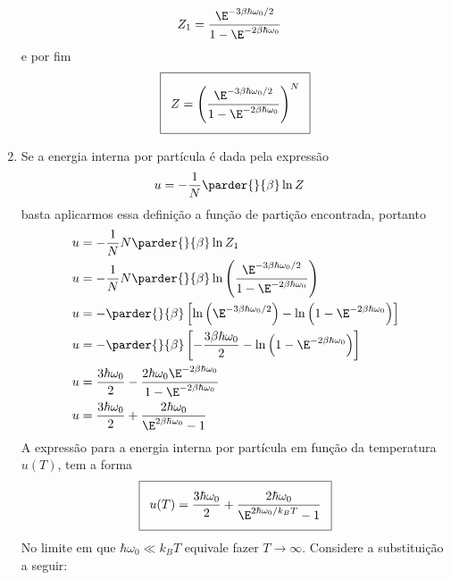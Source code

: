 \begin{prob}
\begin{sol}
\begin{enumerate}[label=\alph *)]
\begin{align}
\begin{split}
          Z_1&=\frac{\E^{-3\beta\hbar\omega_0/2}}{1-\E^{-2\beta\hbar\omega_0}}
        \end{split}
      \end{align}
      e por fim
      \begin{align}
        \addtolength{\fboxsep}{5pt}
        \boxed{
          \begin{gathered}
            Z=\left(\frac{\E^{-3\beta\hbar\omega_0/2}}{1-\E^{-2\beta\hbar\omega_0}}\right)^N
          \end{gathered}
        }        
      \end{align}
      \item Se a energia interna por partícula é dada pela expressão
      \begin{align}
        u&=-\frac{1}{N}\parder{}{\beta}\ln Z
      \end{align}
      basta aplicarmos essa definição a função de partição encontrada, portanto
      \begin{align}
        \begin{split}
          u&=-\frac{1}{N}N\parder{}{\beta}\ln Z_1\\
          u&=-\frac{1}{N}N\parder{}{\beta}\ln \left(\frac{\E^{-3\beta\hbar\omega_0/2}}{1-\E^{-2\beta\hbar\omega_0}}\right)\\
          u&=-\parder{}{\beta}\left[\ln\left(\E^{-3\beta\hbar\omega_0/2}\right)-\ln\left(1-\E^{-2\beta\hbar\omega_0}\right)\right]\\
          u&=-\parder{}{\beta}\left[-\frac{3\beta\hbar\omega_0}{2}-\ln\left(1-\E^{-2\beta\hbar\omega_0}\right)\right]\\
          u&=\frac{3\hbar\omega_0}{2}-\frac{2\hbar\omega_0 \E^{-2\beta\hbar\omega_0}}{1-\E^{-2\beta\hbar\omega_0}}\\
          u&=\frac{3\hbar\omega_0}{2}+\frac{2\hbar\omega_0}{\E^{2\beta\hbar\omega_0}-1}
        \end{split}
      \end{align}
      A expressão para a energia interna por partícula em função da temperatura $u(T)$, tem a forma
      \begin{align}
        \addtolength{\fboxsep}{5pt}
        \boxed{
          \begin{gathered}
            u(T)=\frac{3\hbar\omega_0}{2}+\frac{2\hbar\omega_0}{\E^{2\hbar\omega_0/k_BT}-1}
          \end{gathered}
        }
      \end{align}
      No limite em que $\hbar\omega_0\ll k_BT$ equivale fazer $T\to\infty$. Considere a substituição a seguir:

\end{enumerate}
\end{sol}
\end{prob}

